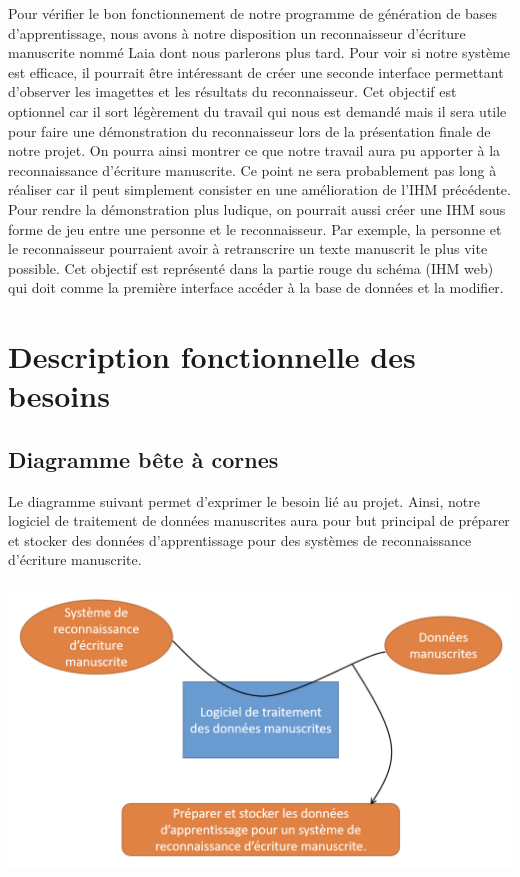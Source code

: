 Pour vérifier le bon fonctionnement de notre programme de génération de bases d’apprentissage, nous avons à notre
disposition un reconnaisseur d’écriture manuscrite nommé Laia\cite{laia:2016} dont nous parlerons plus tard.
Pour voir si notre système est efficace, il pourrait être intéressant de créer une seconde interface permettant
d’observer les imagettes et les résultats du reconnaisseur. Cet objectif est optionnel car il sort légèrement du
travail qui nous est demandé mais il sera utile pour faire une démonstration du reconnaisseur lors de la présentation
finale de notre projet. On pourra ainsi montrer ce que notre travail aura pu apporter à la reconnaissance d’écriture
manuscrite. Ce point ne sera probablement pas long à réaliser car il peut simplement consister en une amélioration
de l’IHM précédente. Pour rendre la démonstration plus ludique, on pourrait aussi créer une IHM sous forme de jeu
entre une personne et le reconnaisseur. Par exemple, la personne et le reconnaisseur pourraient avoir à retranscrire
un texte manuscrit le plus vite possible. Cet objectif est représenté dans la partie rouge du schéma (IHM web) qui
doit comme la première interface accéder à la base de données et la modifier.

\section{Description fonctionnelle des besoins}

\subsection{Diagramme bête à cornes}

Le diagramme suivant permet d’exprimer le besoin lié au projet. Ainsi, notre logiciel de
traitement de données manuscrites aura pour but principal de préparer et stocker des données
d’apprentissage pour des systèmes de reconnaissance d’écriture manuscrite.

\paragraph{}
\begin{mdframed}
\begin{center}
\includegraphics[width=0.7\linewidth]{bete-a-cornes.png}
\end{center}
\end{mdframed}

